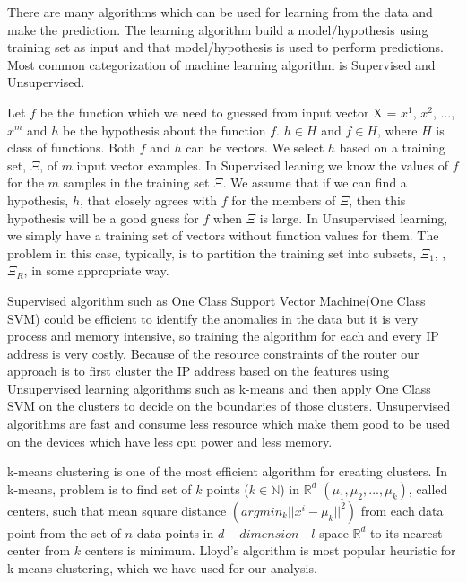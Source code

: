 \documentclass[10pt,oneside,a4paper]{article}
\begin{document}
There are many algorithms which can be used for learning from the data and make the prediction. The learning algorithm build a model/hypothesis using training set as input and that model/hypothesis is used to perform predictions. Most common categorization of machine learning algorithm is Supervised and Unsupervised.

Let $f$ be the function which we need to guessed from input vector X = $x^{1}$, $x^{2}$, ..., $x^{m}$ and $h$ be the hypothesis about the function $f$. $h \in H$ and $f \in H$, where $H$ is class of functions. Both $f$ and $h$ can be vectors. We select $h$ based on a
training set, $\Xi$, of $m$ input vector examples. In Supervised leaning we know the values of $f$ for the $m$ samples in the training set $\Xi$. We assume that if we can find a hypothesis, $h$, that closely agrees with $f$ for the members of $\Xi$, then this hypothesis will be a good guess for $f$ when $\Xi$ is large. In Unsupervised learning, we simply have a training set of vectors without function values for them. The problem in this case, typically, is to partition the training set into subsets, $\Xi_1$,  ,$\Xi_R$, in some appropriate way.\cite{machineLearning}

Supervised algorithm such as One Class Support Vector Machine(One Class SVM)\cite{SVM} could be efficient to identify the anomalies in the data but it is very process and memory intensive, so training the algorithm for each and every IP address is very costly. Because of the resource constraints of the router our approach is to first cluster the IP address based on the features using Unsupervised learning algorithms such as k-means and then apply One Class SVM on the clusters to decide on the boundaries of those clusters. Unsupervised algorithms are fast and consume less resource which make them good to be used on the devices which have less cpu power and less memory.

k-means clustering is one of the most efficient algorithm for creating clusters. In k-means, problem is to find set of $k$ points ($k \in \mathbb{N}$) in $\mathbb{R}^d$ $(\mu_{1}, \mu_{2}, ..., \mu_{k})$, called centers, such that mean square distance $(argmin_{k} || x^{i} {-} \mu_{k} ||^{2})$ from each data point from the set of $n$ data points in $d-dimensionl$ space $\mathbb{R}^d$ to its nearest center from $k$ centers is minimum. Lloyd's algorithm is most popular heuristic for k-means clustering, which we have used for our analysis.
\cite{kmeanClustering}
\end{document}
